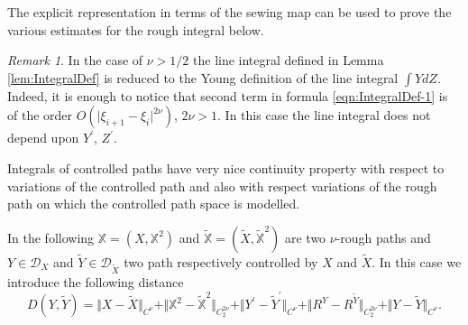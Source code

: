 \documentclass[11pt,a4paper,reqno]{amsart}%
\theoremstyle{plain}
\theoremstyle{remark}
\newtheorem{remark}[theorem]{Remark}
\theoremstyle{plain}
\numberwithin{equation}{section}
\begin{document}
The explicit representation in terms of the sewing map can be used to prove the various estimates for the rough integral below.
\begin{remark}\label{rem:SmoothCase}
In the case of $\nu>1/2$ the line integral defined in 
Lemma \ref{lem:IntegralDef} is reduced to the Young definition of the
line integral $\int YdZ$. Indeed, it is enough to notice that
second term in formula \eqref{eqn:IntegralDef-1} is of the order
$O(\vert \xi_{i+1}-\xi_i\vert^{2\nu})$, $2\nu>1$. In this case the line integral
does not depend upon $Y^\prime$, $Z^\prime$.
\end{remark}

Integrals of controlled paths have very nice continuity property with respect to variations of the controlled path and also with respect variations of the  rough path on which the controlled path space is modelled.

In the following $\mathbb{X}=(X,\mathbb{X}^2)$ and $\tilde{\mathbb{X}}=(\tilde{X},\tilde{\mathbb{X}}^2)$ are two $\nu$-rough paths and  $Y\in\mathcal{D}_X$ and $\tilde{Y}\in\mathcal{D}_{\tilde{X}}$ two path respectively controlled by $X$ and $\tilde X$. In this case we introduce the following distance
\begin{equation}\label{eqn-distance}
D(Y,\tilde{Y}) = \Vert X-\tilde{X}\Vert_{C^{\nu}}+\Vert \mathbb{X}^2-\mathbb{\tilde{X}}^2\Vert_{C_2^{2\nu}}+\Vert Y^\prime-\tilde{Y}^\prime\Vert_{C^{\nu}}+\Vert R^Y-R^{\tilde{Y}}\Vert_{C_2^{2\nu}}+\Vert Y-\tilde{Y}\Vert_{C^{\nu}}.
\end{equation}
\end{document}

